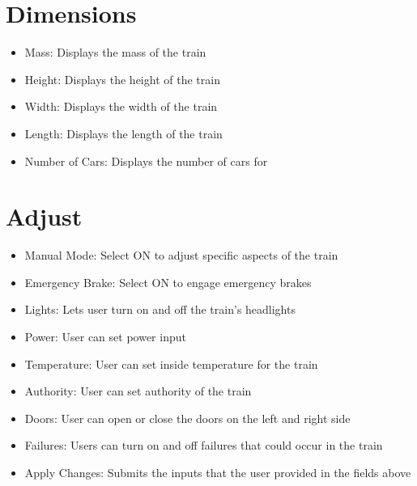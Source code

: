 \documentclass{scrreprt}
\begin{document}
\section{Dimensions}
\begin{itemize}
    \item Mass: Displays the mass of the train
    \item Height: Displays the height of the train
    \item Width: Displays the width of the train
    \item Length: Displays the length of the train
    \item Number of Cars: Displays the number of cars for
\end{itemize}

\section{Adjust}

\begin{itemize}
    \item Manual Mode: Select ON to adjust specific aspects of the train
    \item Emergency Brake: Select ON to engage emergency brakes
    \item Lights: Lets user turn on and off the train's headlights
    \item Power: User can set power input
    \item Temperature: User can set inside temperature for the train
    \item Authority: User can set authority of the train
    \item Doors: User can open or close the doors on the left and right side
    \item Failures: Users can turn on and off failures that could occur in the train
    \item Apply Changes: Submits the inputs that the user provided in the fields above
    \end{itemize}
\end{document}
